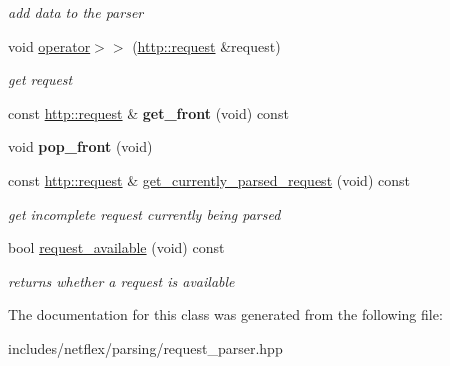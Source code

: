\begin{DoxyCompactItemize}
\begin{DoxyCompactList}\small\item\em add data to the parser \end{DoxyCompactList}\item 
\mbox{\label{classnetflex_1_1parsing_1_1request__parser_a04e1c01d3e1dfa09df931bfb0c866e07}} 
void \hyperlink{classnetflex_1_1parsing_1_1request__parser_a04e1c01d3e1dfa09df931bfb0c866e07}{operator$>$$>$} (\hyperlink{classnetflex_1_1http_1_1request}{http\+::request} \&request)
\begin{DoxyCompactList}\small\item\em get request \end{DoxyCompactList}\item 
\mbox{\label{classnetflex_1_1parsing_1_1request__parser_a922495ec5c2ac20be2f8495ec1b06217}} 
const \hyperlink{classnetflex_1_1http_1_1request}{http\+::request} \& {\bfseries get\+\_\+front} (void) const
\item 
\mbox{\label{classnetflex_1_1parsing_1_1request__parser_abd61692d9c98b6d02733afcd9b5fe5ce}} 
void {\bfseries pop\+\_\+front} (void)
\item 
\mbox{\label{classnetflex_1_1parsing_1_1request__parser_a7ca420f9a3451b2e631fa5f3394f096a}} 
const \hyperlink{classnetflex_1_1http_1_1request}{http\+::request} \& \hyperlink{classnetflex_1_1parsing_1_1request__parser_a7ca420f9a3451b2e631fa5f3394f096a}{get\+\_\+currently\+\_\+parsed\+\_\+request} (void) const
\begin{DoxyCompactList}\small\item\em get incomplete request currently being parsed \end{DoxyCompactList}\item 
\mbox{\label{classnetflex_1_1parsing_1_1request__parser_aa0918393e460b72dec336ee75db7e2eb}} 
bool \hyperlink{classnetflex_1_1parsing_1_1request__parser_aa0918393e460b72dec336ee75db7e2eb}{request\+\_\+available} (void) const
\begin{DoxyCompactList}\small\item\em returns whether a request is available \end{DoxyCompactList}\end{DoxyCompactItemize}


The documentation for this class was generated from the following file\+:\begin{DoxyCompactItemize}
\item 
includes/netflex/parsing/request\+\_\+parser.\+hpp\end{DoxyCompactItemize}
